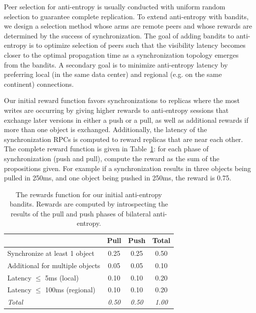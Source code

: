 Peer selection for anti-entropy is usually conducted with uniform random
selection to guarantee complete replication.
To extend anti-entropy with bandits, we design a selection method whose arms
are remote peers and whose rewards are determined by the success of
synchronization.
The goal of adding bandits to anti-entropy is to optimize selection of peers
such that the visibility latency becomes closer to the optimal propagation
time as a synchronization topology emerges from the bandits.
A secondary goal is to minimize anti-entropy latency by preferring local (in
the same data center) and regional (e.g. on the same continent) connections.

Our initial reward function favors synchronizations to replicas where the
most writes are occurring by giving higher rewards to anti-entropy sessions
that exchange later versions in either a push or a pull, as well as additional
rewards if more than one object is exchanged.
Additionally, the latency of the synchronization RPCs is computed to reward
replicas that are near each other.
The complete reward function is given in Table~\ref{tab:ch06_rewards}: for each
phase of synchronization (push and pull), compute the reward as the sum of the
propositions given.
For example if a synchronization results in three objects being pulled in
250ms, and one object being pushed in 250ms, the reward is 0.75.

\renewcommand{\baselinestretch}{1}
\small\normalsize
 \begin{table}[ht]
\caption[Bandit Reward Function]{The rewards function for our initial anti-entropy bandits. Rewards are computed by introspecting the results of the pull and push phases of bilateral anti-entropy.}
\begin{center}
\begin{tabular}{@{}l c c c @{}}
\hline
& \textbf{Pull} & \textbf{Push} & \textbf{Total} \\
\hline \hline
Synchronize at least 1 object & 0.25 & 0.25 & 0.50 \\
Additional for multiple objects  & 0.05 & 0.05 & 0.10 \\
Latency $\leq$ 5ms (local)        & 0.10 & 0.10 & 0.20 \\
Latency $\leq$ 100ms (regional)   & 0.10 & 0.10 & 0.20 \\
\hline
\textit{Total} & \textit{0.50} & \textit{0.50} & \textit{1.00} \\
\hline
\end{tabular}
\end{center}
\label{tab:ch06_rewards}
\end{table}
 \renewcommand{\baselinestretch}{2}
\small\normalsize

